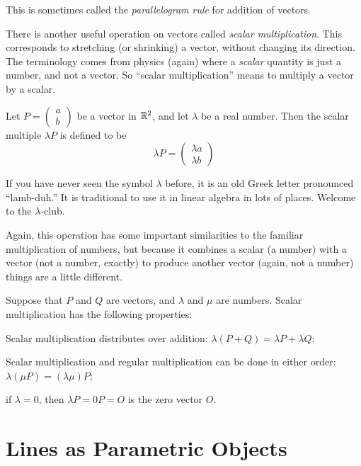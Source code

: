 \documentclass[00-livre-main.tex]{subfiles}
\begin{document}
This is sometimes called the \emph{parallelogram rule} for addition of vectors.

There is another useful operation on vectors called \emph{scalar multiplication}. 
This corresponds to stretching (or shrinking) a vector, without changing its direction.
The terminology comes from physics (again) where a \emph{scalar} quantity is just a number, and not a vector.
So ``scalar multiplication'' means to multiply a vector by a scalar.


\begin{definition}
Let $P = \left( \begin{smallmatrix} a \\ b \end{smallmatrix}\right)$ be a vector in $\mathbb{R}^2$, and let $\lambda$ be a real number. Then the scalar multiple $\lambda P$ is defined to be
\[
\lambda P = \begin{pmatrix} \lambda a \\ \lambda b \end{pmatrix}
\]
\end{definition}

If you have never seen the symbol $\lambda$ before, it is an old Greek letter pronounced ``lamb-duh.'' It is traditional to use it in linear algebra in lots of places. Welcome to the $\lambda$-club.

Again, this operation has some important similarities to the familiar multiplication of numbers, but because it combines a scalar (a number) with a vector (not a number, exactly) to produce another vector (again, not a number) things are a little different.

\begin{theorem}
Suppose that $P$ and $Q$ are vectors, and $\lambda$ and $\mu$ are numbers. Scalar multiplication has the following properties:
\begin{compactitem}
\item Scalar multiplication distributes over addition: $\lambda(P+Q) = \lambda P + \lambda Q$;
\item Scalar multiplication and regular multiplication can be done in either order: $\lambda(\mu P) = (\lambda\mu) P$;
\item if $\lambda = 0$, then $\lambda P = 0 P = O$ is the zero vector $O$.
\end{compactitem}

\end{theorem}

\section*{Lines as Parametric Objects}
\end{document}
